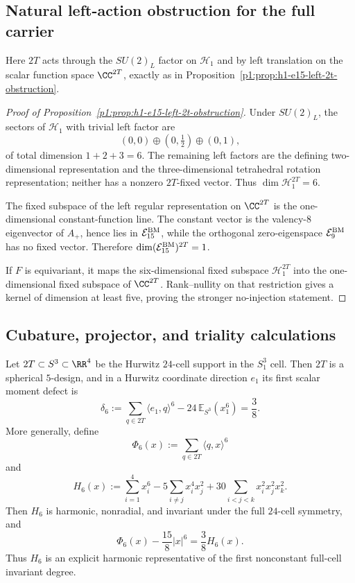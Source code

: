 \documentclass[11pt]{article}
\begin{document}
\subsection{Natural left-action obstruction for the full carrier}
\label{p1:app:left-2t-carrier-obstruction}
Here \(2T\) acts through the \(SU(2)_L\) factor on \(\mathcal H_1\) and by
left translation on the scalar function space \(\CC^{2T}\), exactly as in
Proposition~\ref{p1:prop:h1-e15-left-2t-obstruction}.

\begin{proof}[Proof of Proposition~\ref{p1:prop:h1-e15-left-2t-obstruction}]
Under \(SU(2)_L\), the sectors of \(\mathcal H_1\) with trivial left factor
are
\[
    (0,0)\oplus(0,\tfrac12)\oplus(0,1),
\]
of total dimension \(1+2+3=6\).  The remaining left factors are the defining
two-dimensional representation and the three-dimensional tetrahedral
rotation representation; neither has a nonzero \(2T\)-fixed vector.
Thus \(\dim\mathcal H_1^{2T}=6\).

The fixed subspace of the left regular representation on
\(\CC^{2T}\) is the one-dimensional constant-function line.  The constant
vector is the valency-\(8\) eigenvector of \(A_+\), hence lies in
\(\mathcal E_{15}^{\rm BM}\), while the orthogonal zero-eigenspace
\(\mathcal E_9^{\rm BM}\) has no fixed vector.  Therefore
\(\dim(\mathcal E_{15}^{\rm BM})^{2T}=1\).

If \(F\) is equivariant, it maps the six-dimensional fixed subspace
\(\mathcal H_1^{2T}\) into the one-dimensional fixed subspace of
\(\CC^{2T}\).  Rank--nullity on that restriction gives a kernel of dimension
at least five, proving the stronger no-injection statement.
\end{proof}

\subsection{Cubature, projector, and triality calculations}

\begin{proposition}
\label{p1:prop:math-hurwitz-cubature-six-defect}
Let \(2T\subset S^3\subset\RR^4\) be the Hurwitz \(24\)-cell support in the
\(S^3_1\) cell.  Then \(2T\) is a spherical \(5\)-design, and in a Hurwitz
coordinate direction \(e_1\) its first scalar moment defect is
\[
  \delta_6:=
  \sum_{q\in 2T}\langle e_1,q\rangle^6
  -24\,\mathbb E_{S^3}(x_1^6)
  =\frac38.
\]
More generally, define
\[
 \Phi_6(x):=\sum_{q\in2T}\langle q,x\rangle^6
\]
and
\[
 H_6(x)
 :=\sum_{i=1}^4x_i^6
 -5\sum_{i\ne j}x_i^4x_j^2
 +30\sum_{i<j<k}x_i^2x_j^2x_k^2.
\]
Then \(H_6\) is harmonic, nonradial, and invariant under the full
\(24\)-cell symmetry, and
\[
 \Phi_6(x)-\frac{15}{8}|x|^6=\frac38H_6(x).
\]
Thus \(H_6\) is an explicit harmonic representative of the first
nonconstant full-cell invariant degree.
\end{proposition}
\end{document}

